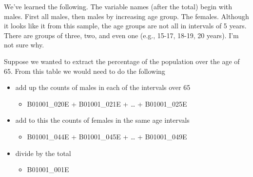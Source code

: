 \documentclass[openany]{book}
\providecommand{\tightlist}{%
  \setlength{\itemsep}{0pt}\setlength{\parskip}{0pt}}
\begin{document}
We've learned the following. The variable names (after the total) begin with males. First all males, then males by increasing age group. The females. Although it looks like it from this sample, the age groups are not all in intervals of 5 years. There are groups of three, two, and even one (e.g., 15-17, 18-19, 20 years). I'm not sure why.

Suppose we wanted to extract the percentage of the population over the age of 65. From this table we would need to do the following

\begin{itemize}
\tightlist
\item
  add up the counts of males in each of the intervals over 65

  \begin{itemize}
  \tightlist
  \item
    B01001\_020E + B01001\_021E + \ldots{} + B01001\_025E
  \end{itemize}
\item
  add to this the counts of females in the same age intervals

  \begin{itemize}
  \tightlist
  \item
    B01001\_044E + B01001\_045E + \ldots{} + B01001\_049E
  \end{itemize}
\item
  divide by the total

  \begin{itemize}
  \tightlist
  \item
    B01001\_001E
  \end{itemize}
\end{itemize}
\end{document}
